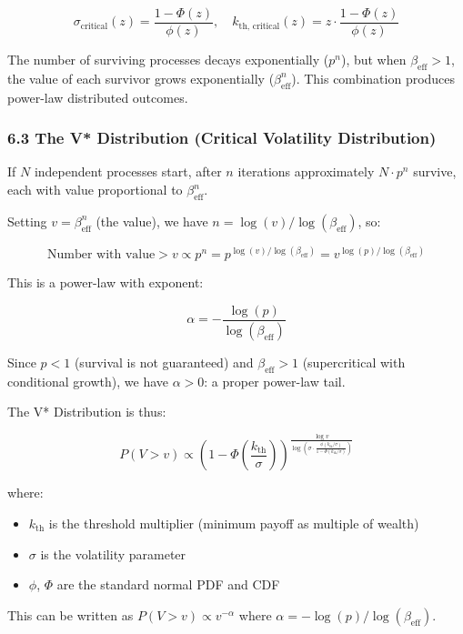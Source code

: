 \documentclass[
  11pt,
  openany]{article}
\providecommand{\tightlist}{%
  \setlength{\itemsep}{0pt}\setlength{\parskip}{0pt}}
\providecommand{\tightlist}{%
  \setlength{\itemsep}{0pt}\setlength{\parskip}{0pt}}
\begin{document}
\[\sigma_{\text{critical}}(z) = \frac{1 - \Phi(z)}{\phi(z)}, \quad k_{\text{th, critical}}(z) = z \cdot \frac{1 - \Phi(z)}{\phi(z)}\]

The number of surviving processes decays exponentially (\(p^n\)), but
when \(\beta_{\text{eff}} > 1\), the value of each survivor grows
exponentially (\(\beta_{\text{eff}}^n\)). This combination produces
power-law distributed outcomes.

\subsubsection{6.3 The V* Distribution (Critical Volatility
Distribution)}\label{the-v-distribution-critical-volatility-distribution}

If \(N\) independent processes start, after \(n\) iterations
approximately \(N \cdot p^n\) survive, each with value proportional to
\(\beta_{\text{eff}}^n\).

Setting \(v = \beta_{\text{eff}}^n\) (the value), we have
\(n = \log(v)/\log(\beta_{\text{eff}})\), so:

\[\text{Number with value} > v \propto p^{n} = p^{\log(v)/\log(\beta_{\text{eff}})} = v^{\log(p)/\log(\beta_{\text{eff}})}\]

This is a power-law with exponent:

\[\alpha = -\frac{\log(p)}{\log(\beta_{\text{eff}})}\]

Since \(p < 1\) (survival is not guaranteed) and
\(\beta_{\text{eff}} > 1\) (supercritical with conditional growth), we
have \(\alpha > 0\): a proper power-law tail.

The V* Distribution is thus:

\[P(V > v) \propto \left(1 - \Phi\left(\frac{k_{\text{th}}}{\sigma}\right)\right)^{\frac{\log v}{\log\left(\sigma \cdot \frac{\phi(k_{\text{th}}/\sigma)}{1 - \Phi(k_{\text{th}}/\sigma)}\right)}}\]

where:

\begin{itemize}
\tightlist
\item
  \(k_{\text{th}}\) is the threshold multiplier (minimum payoff as
  multiple of wealth)
\item
  \(\sigma\) is the volatility parameter
\item
  \(\phi\), \(\Phi\) are the standard normal PDF and CDF
\end{itemize}

This can be written as \(P(V > v) \propto v^{-\alpha}\) where
\(\alpha = -\log(p)/\log(\beta_{\text{eff}})\).
\end{document}
